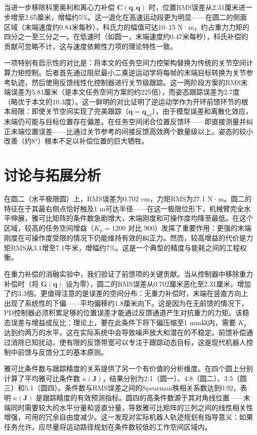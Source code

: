 \documentclass{article}
\begin{document}
当进一步移除科里奥利和离心力补偿 \(\boldsymbol{C}(\boldsymbol{q}, \dot{\boldsymbol{q}})\) 时，位置RMS误差从2.31厘米进一步增至2.65厘米，增幅约5\%。这一退化在高速运动段更为明显——在圆二的侧面区域（末端速度约0.84米每秒），科氏力的幅值可达10--15 N·m，约占重力力矩的四分之一至三分之一。在低速时（如圆一，末端速度约0.47米每秒），科氏补偿的贡献可忽略不计，这与速度依赖性力项的理论特性一致。

一项特别有启示性的对比是：将本文的任务空间力控架构替换为传统的关节空间计算力矩控制。后者首先通过阻尼最小二乘逆运动学将每帧的末端目标转换为关节参考轨迹，然后使用反馈线性化控制器进行关节级跟踪。这一两阶段方案的RMS末端误差为5.81厘米（是本文任务空间方案的约225倍），而姿态跟踪误差为2.7度（略优于本文的10.3度）。这一鲜明的对比证明了逆运动学作为开环前馈环节的根本局限：即使关节空间实现了完美跟踪（\(\boldsymbol{q} = \boldsymbol{q}_{\text{ref}}\)），由于模型误差和离散化效应，末端仍可能与目标位置存在偏差。在任务空间闭合位置反馈环——即直接测量并纠正末端位置误差——比通过关节参考的间接反馈高效两个数量级以上。姿态的较小改善（约8°）根本不足以补偿位置的巨大牺牲。

\section{讨论与拓展分析}

在圆二（水平极限圆）上，RMS误差为0.702 cm，力矩RMS为27.1 N·m。圆二的特征在于其最右侧点恰好触及1 m可达半径——在这一极限位形下，机械臂完全水平伸展，雅可比矩阵的条件数急剧增大，末端刚度和可操作度均降至最低。在这个区域，较高的任务空间增益（\(K_p=1200\) 对比 \(900\)）发挥了重要作用：更强的末端刚度在可操作度受限的情况下仍能维持有效的纠正力。然而，较高增益的代价是力矩RMS从3.1增至7.1牛米，增幅约7\%。这是一个典型的精度与能耗之间的工程权衡。

在重力补偿的消融实验中，我们验证了前馈项的关键贡献。当从控制器中移除重力补偿时（将 \(\boldsymbol{G}(\boldsymbol{q})\) 设为零），圆二的RMS误差从0.702厘米恶化至2.31厘米，增加了约3.3倍。更值得注意的是误差的空间分布：无重力补偿时，末端在竖直方向上出现了系统性的下偏——平均偏移约1.8厘米向下。这是因为在无前馈的情况下，PD控制器必须积累足够的位置误差才能通过反馈通道产生对抗重力的力矩。该稳态误差与增益成反比：理论上，要在此条件下将下偏压缩至1 mm以内，需要 \(K_p\) 达到约两万的水平，这在实际系统中会导致噪声放大和潜在的不稳定。前馈补偿通过消除已知扰动，使有限的反馈带宽可以专注于跟踪动态目标，这是现代机器人控制中前馈与反馈分工的基本原则。

雅可比条件数与跟踪精度的关系提供了另一个有价值的分析维度。在四个圆上分别计算了平均雅可比条件数 \(\kappa(\boldsymbol{J})\)，结果分别为2.1（圆一）、4.8（圆二）、3.5（圆三）和5.1（圆四）。条件数与RMS误差之间的Spearman秩相关系数达到0.92，表明 \(\kappa(\boldsymbol{J})\) 是跟踪精度的有效预测指标。圆四的高条件数源于其对角线位置——末端同时需要较大的水平分量和竖直分量，导致雅可比矩阵的三列之间的线性相关性增强，可用的冗余自由度减少。这一发现对实际机器人轨迹规划有指导意义：如果任务允许，应尽量将运动路径规划在条件数较低的工作空间区域内。
\end{document}

